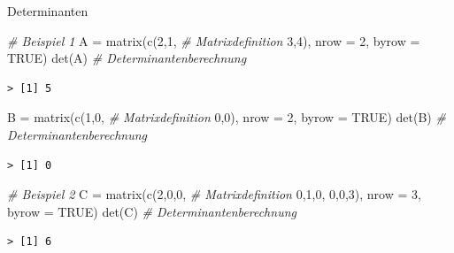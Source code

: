 \documentclass[
  8pt,
  ignorenonframetext,
]{beamer}
\newenvironment{Shaded}{\begin{snugshade}}{\end{snugshade}}
\newcommand{\AttributeTok}[1]{\textcolor[rgb]{0.77,0.63,0.00}{#1}}
\newcommand{\CommentTok}[1]{\textcolor[rgb]{0.56,0.35,0.01}{\textit{#1}}}
\newcommand{\ConstantTok}[1]{\textcolor[rgb]{0.00,0.00,0.00}{#1}}
\newcommand{\DecValTok}[1]{\textcolor[rgb]{0.00,0.00,0.81}{#1}}
\newcommand{\FunctionTok}[1]{\textcolor[rgb]{0.00,0.00,0.00}{#1}}
\newcommand{\NormalTok}[1]{#1}
\newcommand{\OtherTok}[1]{\textcolor[rgb]{0.56,0.35,0.01}{#1}}
\begin{document}
\begin{frame}[fragile]{Determinanten}
\protect\hypertarget{determinanten-4}{}
\footnotesize

\begin{Shaded}
\begin{Highlighting}[]
\CommentTok{\# Beispiel 1}
\NormalTok{A }\OtherTok{=} \FunctionTok{matrix}\NormalTok{(}\FunctionTok{c}\NormalTok{(}\DecValTok{2}\NormalTok{,}\DecValTok{1}\NormalTok{,                  }\CommentTok{\# Matrixdefinition}
             \DecValTok{3}\NormalTok{,}\DecValTok{4}\NormalTok{),}
           \AttributeTok{nrow =} \DecValTok{2}\NormalTok{,}
           \AttributeTok{byrow =} \ConstantTok{TRUE}\NormalTok{)}
\FunctionTok{det}\NormalTok{(A)                             }\CommentTok{\# Determinantenberechnung}
\end{Highlighting}
\end{Shaded}

\begin{verbatim}
> [1] 5
\end{verbatim}

\begin{Shaded}
\begin{Highlighting}[]
\NormalTok{B }\OtherTok{=} \FunctionTok{matrix}\NormalTok{(}\FunctionTok{c}\NormalTok{(}\DecValTok{1}\NormalTok{,}\DecValTok{0}\NormalTok{,                  }\CommentTok{\# Matrixdefinition}
             \DecValTok{0}\NormalTok{,}\DecValTok{0}\NormalTok{),}
           \AttributeTok{nrow =} \DecValTok{2}\NormalTok{,}
           \AttributeTok{byrow =} \ConstantTok{TRUE}\NormalTok{)}
\FunctionTok{det}\NormalTok{(B)                             }\CommentTok{\# Determinantenberechnung}
\end{Highlighting}
\end{Shaded}

\begin{verbatim}
> [1] 0
\end{verbatim}

\begin{Shaded}
\begin{Highlighting}[]
\CommentTok{\# Beispiel 2}
\NormalTok{C }\OtherTok{=} \FunctionTok{matrix}\NormalTok{(}\FunctionTok{c}\NormalTok{(}\DecValTok{2}\NormalTok{,}\DecValTok{0}\NormalTok{,}\DecValTok{0}\NormalTok{,                }\CommentTok{\# Matrixdefinition}
             \DecValTok{0}\NormalTok{,}\DecValTok{1}\NormalTok{,}\DecValTok{0}\NormalTok{,}
             \DecValTok{0}\NormalTok{,}\DecValTok{0}\NormalTok{,}\DecValTok{3}\NormalTok{),}
           \AttributeTok{nrow =} \DecValTok{3}\NormalTok{,}
           \AttributeTok{byrow =} \ConstantTok{TRUE}\NormalTok{)}
\FunctionTok{det}\NormalTok{(C)                             }\CommentTok{\# Determinantenberechnung}
\end{Highlighting}
\end{Shaded}

\begin{verbatim}
> [1] 6
\end{verbatim}
\end{frame}
\end{document}
